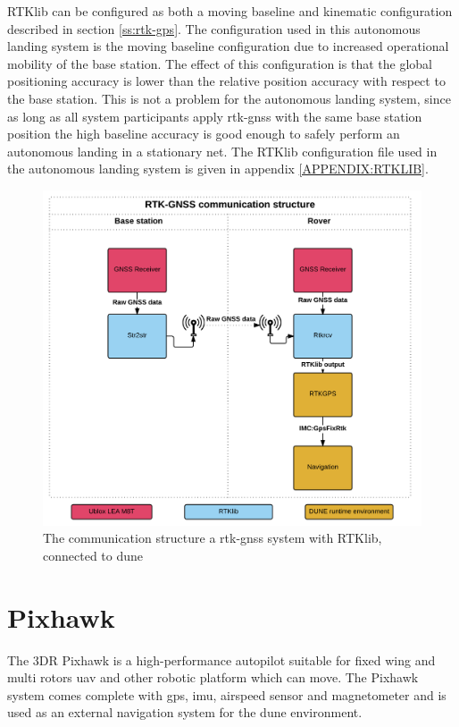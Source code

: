 RTKlib can be configured as both a moving baseline and kinematic configuration described in section \ref{ss:rtk-gps}. The configuration used in this autonomous landing system is the moving baseline configuration due to increased operational mobility of the base station. The effect of this configuration is that the global positioning accuracy is lower than the relative position accuracy with respect to the base station. This is not a problem for the autonomous landing system, since as long as all system participants apply \gls{rtk-gnss} with the same base station position the high baseline accuracy is good enough to safely perform an autonomous landing in a stationary net. The RTKlib configuration file used in the autonomous landing system is given in appendix \ref{APPENDIX:RTKLIB}.
\begin{figure}[h]
	\centering
		\includegraphics[scale=0.7]{figs/RTKGNSS.png}
		\caption{The communication structure a \gls{rtk-gnss} system with RTKlib, connected to \gls{dune}}
		\label{figure:RTKLIB_STRUCTURE}
\end{figure}
\newpage

\section{Pixhawk}\label{ss:Pixhawk}
The 3DR Pixhawk is a high-performance autopilot suitable for fixed wing and multi rotors \gls{uav} and other robotic platform which can move. The Pixhawk system comes complete with \gls{gps}, \gls{imu}, airspeed sensor and magnetometer and is used as an external navigation system for the \gls{dune} environment.
